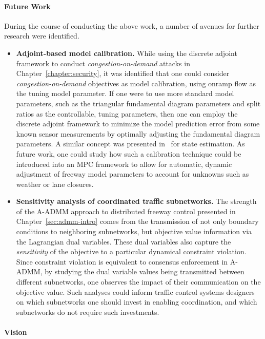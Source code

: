 \paragraph*{Future Work}

During the course of conducting the above work, a number of avenues for further research were identified.

\begin{itemize}
	\item \textbf{Adjoint-based model calibration.} While using the discrete adjoint framework to conduct \emph{congestion-on-demand} attacks in Chapter~\ref{chapter:security}, it was identified that one could consider \emph{congestion-on-demand} objectives as model calibration, using onramp flow as the tuning model parameter. If one were to use more standard model parameters, such as the triangular fundamental diagram parameters and split ratios as the controllable, tuning parameters, then one can employ the discrete adjoint framework to minimize the model prediction error from some known sensor measurements by optimally adjusting the fundamental diagram parameters. A similar concept was presented in~\cite{Jacquet2005} for state estimation. As future work, one could study how such a calibration technique could be introduced into an MPC framework to allow for automatic, dynamic adjustment of freeway model parameters to account for unknowns such as weather or lane closures.
	\item \textbf{Sensitivity analysis of coordinated traffic subnetworks.} The strength of the A-ADMM approach to distributed freeway control presented in Chapter~\ref{sec:admm-intro} comes from the transmission of not only boundary conditions to neighboring subnetworks, but objective value information via the Lagrangian dual variables. These dual variables also capture the \emph{sensitivity} of the objective to a particular dynamical constraint violation. Since constraint violation is equivalent to consensus enforcement in A-ADMM, by studying the dual variable values being transmitted between different subnetworks, one observes the impact of their communication on the objective value. Such analyses could inform traffic control systems designers on which subnetworks one should invest in enabling coordination, and which subnetworks do not require such investments.
\end{itemize}

\paragraph*{Vision}

